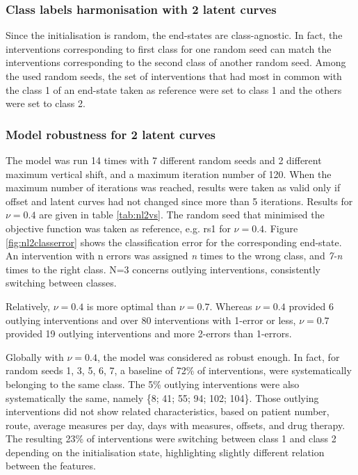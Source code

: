\subsubsection{Class labels harmonisation with 2 latent curves}
Since the initialisation is random, the end-states are class-agnostic. In fact, the interventions corresponding to first class for one random seed can match the interventions corresponding to the second class of another random seed. Among the used random seeds, the set of interventions that had most in common with the class 1 of an end-state taken as reference were set to class 1 and the others were set to class 2.

\subsubsection{Model robustness for 2 latent curves} \label{sec:robustness}
The model was run 14 times with 7 different random seeds and 2 different maximum vertical shift, and a maximum iteration number of 120. When the maximum number of iterations was reached, results were taken as valid only if offset and latent curves had not changed since more than 5 iterations. Results for $\nu=0.4$ are given in table \ref{tab:nl2vs}. The random seed that minimised the objective function was taken as reference, e.g. rs1 for $\nu=0.4$. Figure \ref{fig:nl2classerror} shows the classification error for the corresponding end-state. An intervention with n errors was assigned \textit{n} times to the wrong class, and \textit{7-n} times to the right class. N=3 concerns outlying interventions, consistently switching between classes.

Relatively, $\nu=0.4$ is more optimal than $\nu=0.7$. Whereas $\nu=0.4$ provided 6 outlying interventions and over 80 interventions with 1-error or less, $\nu=0.7$ provided 19 outlying interventions and more 2-errors than 1-errors.

Globally with $\nu=0.4$, the model was considered as robust enough. In fact, for random seeds 1, 3, 5, 6, 7, a baseline of 72\% of interventions, were systematically belonging to the same class. The 5\% outlying interventions were also systematically the same, namely \{8; 41; 55; 94; 102; 104\}. Those outlying interventions did not show related characteristics, based on patient number, route, average measures per day, days with measures, offsets, and drug therapy. The resulting 23\% of interventions were switching between class 1 and class 2 depending on the initialisation state, highlighting slightly different relation between the features.


